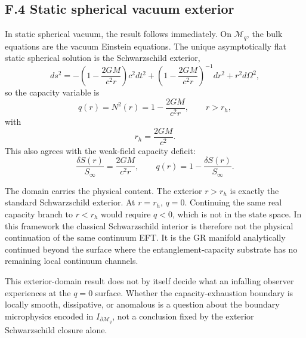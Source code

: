 \documentclass[11pt]{article}
\begin{document}
\subsection*{F.4 Static spherical vacuum exterior}

In static spherical vacuum, the result follows immediately. On $\mathcal{M}_q$, the bulk equations are the vacuum Einstein equations. The unique asymptotically flat static spherical solution is the Schwarzschild exterior,
\[
ds^2
=
-\left(1-\frac{2GM}{c^2r}\right)c^2dt^2
+
\left(1-\frac{2GM}{c^2r}\right)^{-1}dr^2
+
r^2d\Omega^2,
\]
so the capacity variable is
\[
q(r)=N^2(r)=1-\frac{2GM}{c^2r},
\qquad
r>r_h,
\]
with
\[
r_h=\frac{2GM}{c^2}.
\]
This also agrees with the weak-field capacity deficit:
\[
\frac{\delta S(r)}{S_\infty}
=
\frac{2GM}{c^2r},
\qquad
q(r)=1-\frac{\delta S(r)}{S_\infty}.
\]

The domain carries the physical content. The exterior $r>r_h$ is exactly the standard Schwarzschild exterior. At $r=r_h$, $q=0$. Continuing the same real capacity branch to $r<r_h$ would require $q<0$, which is not in the state space. In this framework the classical Schwarzschild interior is therefore not the physical continuation of the same continuum EFT. It is the GR manifold analytically continued beyond the surface where the entanglement-capacity substrate has no remaining local continuum channels.

This exterior-domain result does not by itself decide what an infalling observer experiences at the $q=0$ surface. Whether the capacity-exhaustion boundary is locally smooth, dissipative, or anomalous is a question about the boundary microphysics encoded in $I_{\partial\mathcal{M}_q}$, not a conclusion fixed by the exterior Schwarzschild closure alone.
\end{document}
